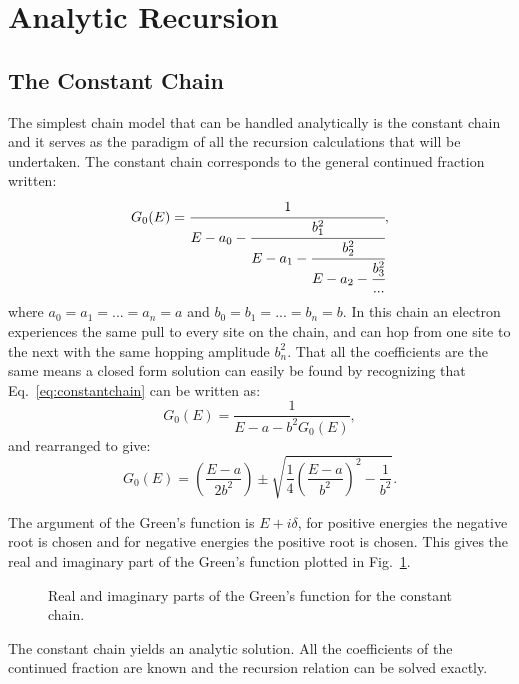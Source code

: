 \section{Analytic Recursion}
\subsection{The Constant Chain}
The simplest chain model that can be handled analytically is the constant chain and it
serves as the paradigm of all the recursion calculations that will be undertaken. 
The constant chain corresponds to the general continued fraction written:
%
\begin{equation}
\label{eq:constantchain}
G_{0}(E) = \cfrac{1}{E-a_{0}-\cfrac{b_{1}^2}{E-a_{1}-\cfrac{b_{2}^{2}}{E-a_{2}-\cfrac{b_{3}^{2}}{...}}}},
\end{equation}
%
where $a_{0}=a_{1}=...=a_{n}=a$ and $b_{0}=b_{1}=...=b_{n}=b$. 
%
In this chain an electron experiences the same pull to 
every site on the chain, and can hop from one site to 
the next with the same hopping amplitude $b^{2}_{n}$. 
%
That all the coefficients are the same means a closed 
form solution can easily be found by recognizing that 
Eq.~\ref{eq:constantchain} can be written as:
%
\begin{equation}
G_{0}(E) = \frac{1}{E-a-b^{2}G_{0}(E)},
\end{equation}
%
and rearranged to give:
%
\begin{equation}
G_{0}(E) = (\frac{E-a}{2b^{2}}) \pm \sqrt{\frac{1}{4}(\frac{E-a}{b^{2}})^{2} - \frac{1}{b^{2}}}.
\end{equation}

The argument of the Green's function is $E + i\delta$, for positive 
energies the negative root is chosen and for negative energies 
the positive root is chosen. This gives the real
and imaginary part of the Green's function plotted 
in Fig.~\ref{fig:gfconstchain}.
%
\begin{figure}
\begin{center}
{\graphicspath{{./invariance/chain_figs/}}}
\caption{Real and imaginary parts of the Green's function for the constant chain.\label{fig:gfconstchain}}
\end{center}
\end{figure}
%
The constant chain yields an analytic solution. All the coefficients of the continued
fraction are known and the recursion relation can be solved exactly. 


